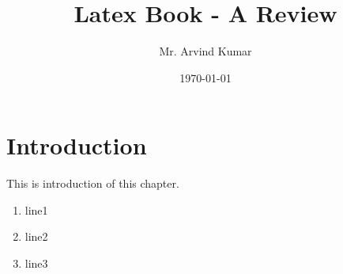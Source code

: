 \documentclass[a4paper,12pt]{book}
\begin{document}
	\title{Latex Book - A Review}
	\author{Mr. Arvind Kumar}
	\date{\today}
	\maketitle
	\tableofcontents
	\newpage
	\chapter{Introduction}
	This is introduction of this chapter.
	\begin{enumerate}
		\item line1
		\item line2
		\item line3
	\end{enumerate}
\end{document}

